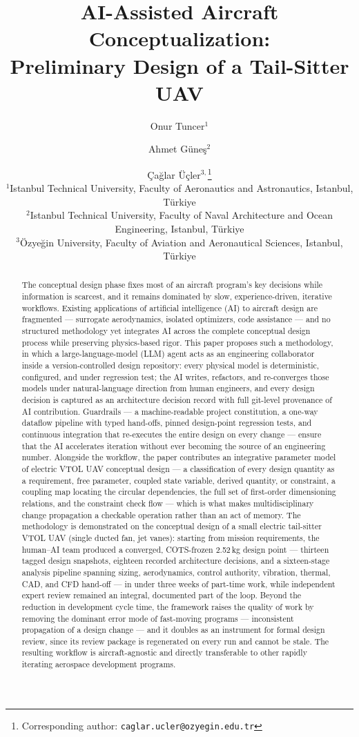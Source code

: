\documentclass[11pt,a4paper]{article}
\title{\textbf{AI-Assisted Aircraft Conceptualization:\\
Preliminary Design of a Tail-Sitter UAV}}
\author{%
  Onur Tuncer$^{1}$
  \and Ahmet G\"une\c{s}$^{2}$
  \and \c{C}a\u{g}lar \"U\c{c}ler$^{3,}$\thanks{Corresponding author:
  \texttt{caglar.ucler@ozyegin.edu.tr}}\\[1ex]
  \small $^{1}$Istanbul Technical University, Faculty of Aeronautics and
  Astronautics, Istanbul, T\"urkiye\\
  \small $^{2}$Istanbul Technical University, Faculty of Naval
  Architecture and Ocean Engineering, Istanbul, T\"urkiye\\
  \small $^{3}$\"Ozye\u{g}in University, Faculty of Aviation and
  Aeronautical Sciences, Istanbul, T\"urkiye%
}
\date{}
\begin{document}
\maketitle

\begin{abstract}
The conceptual design phase fixes most of an aircraft program's key
decisions while information is scarcest, and it remains dominated by
slow, experience-driven, iterative workflows. Existing applications of
artificial intelligence (AI) to aircraft design are fragmented ---
surrogate aerodynamics, isolated optimizers, code assistance --- and no
structured methodology yet integrates AI across the complete conceptual
design process while preserving physics-based rigor. This paper
proposes such a methodology, in which a large-language-model (LLM)
agent acts as an engineering collaborator inside a version-controlled
design repository: every physical model is deterministic, configured,
and under regression test; the AI writes, refactors, and re-converges
those models under natural-language direction from human engineers, and
every design decision is captured as an architecture decision record
with full git-level provenance of AI contribution. Guardrails --- a
machine-readable project constitution, a one-way dataflow pipeline with
typed hand-offs, pinned design-point regression tests, and continuous
integration that re-executes the entire design on every change ---
ensure that the AI accelerates iteration without ever becoming the
source of an engineering number. Alongside the workflow, the paper
contributes an integrative parameter model of electric VTOL UAV
conceptual design --- a classification of every design quantity as a
requirement, free parameter, coupled state variable, derived quantity,
or constraint, a coupling map locating the circular dependencies, the
full set of first-order dimensioning relations, and the constraint
check flow --- which is what makes multidisciplinary change propagation
a checkable operation rather than an act of memory. The methodology is
demonstrated on the
conceptual design of a small electric tail-sitter VTOL UAV (single
ducted fan, jet vanes): starting from mission requirements, the
human--AI team produced a converged, COTS-frozen 2.52\,kg design point
--- thirteen tagged design snapshots, eighteen recorded architecture
decisions, and a sixteen-stage analysis pipeline spanning sizing,
aerodynamics, control authority, vibration, thermal, CAD, and CFD
hand-off --- in under three weeks of part-time work, while independent
expert review remained an integral, documented part of the loop.
Beyond the reduction in development cycle time, the framework raises
the quality of work by removing the dominant error mode of fast-moving
programs --- inconsistent propagation of a design change --- and it
doubles as an instrument for formal design review, since its review
package is regenerated on every run and cannot be stale. The resulting
workflow is aircraft-agnostic and directly transferable to other
rapidly iterating aerospace development programs.
\end{abstract}
\end{document}
